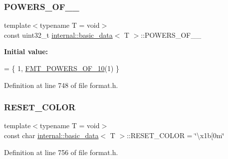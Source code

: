 \subsubsection{\texorpdfstring{P\+O\+W\+E\+R\+S\+\_\+\+O\+F\+\_\+\_}{POWERS\_OF\_10\_32}}
{\footnotesize\ttfamily template$<$typename T  = void$>$ \\
const uint32\+\_\+t \hyperlink{structinternal_1_1basic__data}{internal\+::basic\+\_\+data}$<$ T $>$\+::P\+O\+W\+E\+R\+S\+\_\+\+O\+F\+\_\+\_\hspace{0.3cm}{\ttfamily [static]}}

{\bfseries Initial value\+:}
\begin{DoxyCode}
= \{
  1, \hyperlink{format-inl_8h_aeff75c93a29bc942ca36b31a4b634fe9}{FMT\_POWERS\_OF\_10}(1)
\}
\end{DoxyCode}


Definition at line 748 of file format.\+h.

\mbox{\label{structinternal_1_1basic__data_a73908f7884a501d0d749d9146b0b05eb}} 
\subsubsection{\texorpdfstring{R\+E\+S\+E\+T\+\_\+\+C\+O\+L\+OR}{RESET\_COLOR}}
{\footnotesize\ttfamily template$<$typename T  = void$>$ \\
const char \hyperlink{structinternal_1_1basic__data}{internal\+::basic\+\_\+data}$<$ T $>$\+::R\+E\+S\+E\+T\+\_\+\+C\+O\+L\+OR = \char`\"{}\textbackslash{}x1b\mbox{[}0m\char`\"{}\hspace{0.3cm}{\ttfamily [static]}}



Definition at line 756 of file format.\+h.

\mbox{\label{structinternal_1_1basic__data_a5995f59c50962f1ec341dab8cddfe58f}} 
